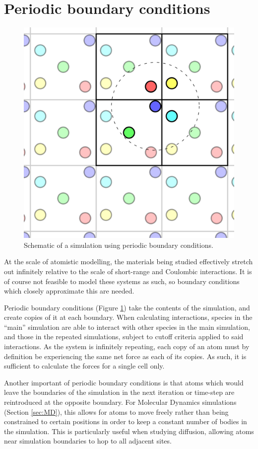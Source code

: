 \section{Periodic boundary conditions}
\begin{figure}[hb]
  \centering
  \includegraphics[width = 0.4\linewidth]{figures/pbc/pbc}
  \caption[Periodic boundary conditions schematic]{Schematic of a simulation using periodic boundary conditions.}
  \label{fig:periodic}
\end{figure}
At the scale of atomistic modelling, the materials being studied effectively stretch out infinitely relative to the scale of short-range and Coulombic interactions.
It is of course not feasible to model these systems as such, so boundary conditions which closely approximate this are needed.

Periodic boundary conditions (Figure \ref{fig:periodic}) take the contents of the simulation, and create copies of it at each boundary.
When calculating interactions, species in the ``main'' simulation are able to interact with other species in the main simulation, and those in the repeated simulations, subject to cutoff criteria applied to said interactions.
As the system is infinitely repeating, each copy of an atom must by definition be experiencing the same net force as each of its copies.
As such, it is sufficient to calculate the forces for a single cell only.

Another important of periodic boundary conditions is that atoms which would leave the boundaries of the simulation in the next iteration or time-step are reintroduced at the opposite boundary.
For Molecular Dynamics simulations (Section \ref{sec:MD}), this allows for atoms to move freely rather than being constrained to certain positions in order to keep a constant number of bodies in the simulation.
This is particularly useful when studying diffusion, allowing atoms near simulation boundaries to hop to all adjacent sites.


\newpage


